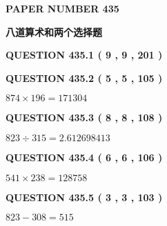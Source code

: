\documentclass{ctexart}
\begin{document}
   
   
   
\newpage 
\setcounter{page}{ 
   435001 } 
   
   
   
   
 {\textbf{ \Large{ PAPER NUMBER  435  }}}
   
   
\vspace{0.2in}
   
   
   
   
   
   
 \vspace{0.2in}
{\LARGE {\textbf{ 八道算术和两个选择题}}}
   
   
  
\vspace{0.2in}
  
{\textbf{\Large{QUESTION
435.1 
 ( 9 , 9 , 201 )
}}}
  
  
  
\vspace{0.2in}
  
{\textbf{\Large{QUESTION
435.2 
 ( 5 , 5 , 105 )
}}}
  
  
 
 

$ %
874 \times  %
196=   %
171304$
 
 
  
\vspace{0.2in}
  
{\textbf{\Large{QUESTION
435.3 
 ( 8 , 8 , 108 )
}}}
  
  
 
 

$ %
823 \div  %
315=   %
2.612698413$
 
 
  
\vspace{0.2in}
  
{\textbf{\Large{QUESTION
435.4 
 ( 6 , 6 , 106 )
}}}
  
  
 
 

$ %
541 \times  %
238=   %
128758$
 
 
  
\vspace{0.2in}
  
{\textbf{\Large{QUESTION
435.5 
 ( 3 , 3 , 103 )
}}}
  
  
 
 

$ %
823 -  %
308=   %
515$
 
\end{document}
